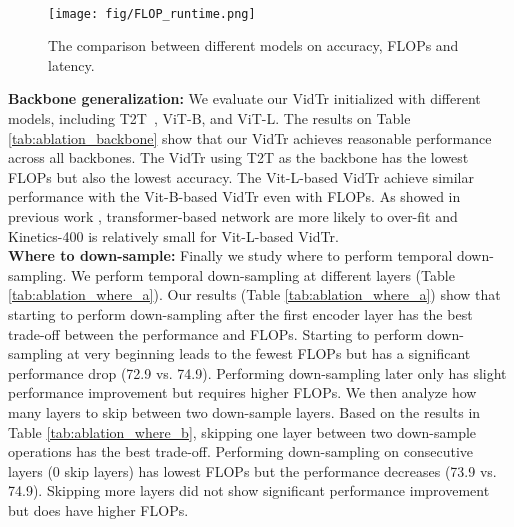 \documentclass[10pt,twocolumn,letterpaper]{article}
\begin{document}
\\
\begin{figure}[t]
\begin{center}
    \texttt{[image: fig/FLOP\_runtime.png]}
	\caption{The comparison between different models on accuracy, FLOPs and latency.}
	\label{fig:k400_FLOPs_latency}
\end{center}
\end{figure}
\textbf{Backbone generalization: }
We evaluate our VidTr initialized with different models, including T2T~\cite{yuan2021tokens}, ViT-B, and ViT-L. The results on Table \ref{tab:ablation_backbone} show that our VidTr achieves reasonable performance across all backbones. The VidTr using T2T as the backbone has the lowest FLOPs but also the lowest accuracy. The Vit-L-based VidTr achieve similar performance with the Vit-B-based VidTr even with  FLOPs.  As showed in previous work \cite{dosovitskiy2020image}, transformer-based network are more likely to over-fit and Kinetics-400 is relatively small for Vit-L-based VidTr.
\\
\textbf{Where to down-sample: }
Finally we study where to perform temporal down-sampling. We perform temporal down-sampling at different layers (Table \ref{tab:ablation_where_a}). Our results (Table \ref{tab:ablation_where_a}) show that starting to perform down-sampling after the first encoder layer has the best trade-off between the performance and FLOPs. Starting to perform down-sampling at very beginning leads to the fewest FLOPs but has a significant performance drop (72.9 vs. 74.9). Performing down-sampling later only has slight performance improvement but requires higher FLOPs. We then analyze how many layers to skip between two down-sample layers. Based on the results in Table \ref{tab:ablation_where_b}, skipping one layer between two down-sample operations has the best trade-off. Performing down-sampling on consecutive layers (0 skip layers) has lowest FLOPs but the performance decreases (73.9 vs. 74.9). Skipping more layers did not show significant performance improvement but does have higher FLOPs.
\end{document}

